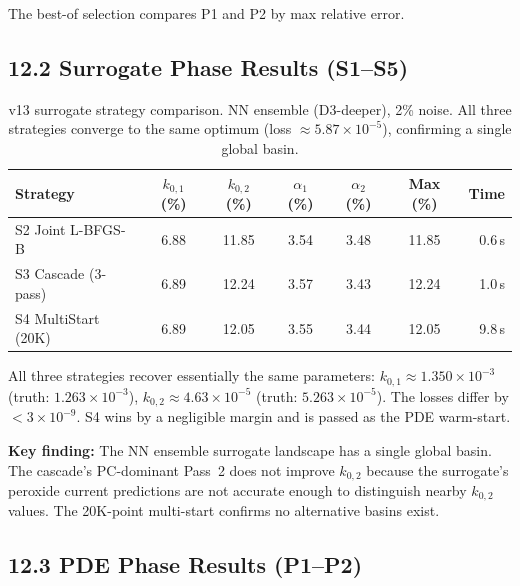 \documentclass[11pt]{article}
\begin{document}
The best-of selection compares P1 and P2 by max relative error.

\subsection*{12.2 Surrogate Phase Results (S1--S5)}

\begin{table}[H]
  \centering
  \caption{v13 surrogate strategy comparison.  NN ensemble (D3-deeper), 2\%
           noise.  All three strategies converge to the same optimum (loss
           $\approx 5.87 \times 10^{-5}$), confirming a single global basin.}
  \label{tab:v13_surr}
  \begin{tabular}{l S[round-precision=2] S[round-precision=2]
                    S[round-precision=2] S[round-precision=2]
                    S[round-precision=2] r}
    \toprule
    Strategy & {$k_{0,1}$ (\%)} & {$k_{0,2}$ (\%)}
             & {$\alpha_1$ (\%)} & {$\alpha_2$ (\%)}
             & {Max (\%)} & {Time} \\
    \midrule
    S2 Joint L-BFGS-B    & 6.88 & 11.85 & 3.54 & 3.48 & 11.85 & 0.6\,s  \\
    S3 Cascade (3-pass)  & 6.89 & 12.24 & 3.57 & 3.43 & 12.24 & 1.0\,s  \\
    S4 MultiStart (20K)  & 6.89 & 12.05 & 3.55 & 3.44 & 12.05 & 9.8\,s  \\
    \bottomrule
  \end{tabular}
\end{table}

All three strategies recover essentially the same parameters:
$k_{0,1} \approx 1.350 \times 10^{-3}$ (truth: $1.263 \times 10^{-3}$),
$k_{0,2} \approx 4.63 \times 10^{-5}$ (truth: $5.263 \times 10^{-5}$).
The losses differ by $< 3 \times 10^{-9}$.  S4 wins by a negligible margin
and is passed as the PDE warm-start.

\textbf{Key finding:} The NN ensemble surrogate landscape has a single global
basin.  The cascade's PC-dominant Pass~2 does not improve $k_{0,2}$ because
the surrogate's peroxide current predictions are not accurate enough to
distinguish nearby $k_{0,2}$ values.  The 20K-point multi-start confirms
no alternative basins exist.

\subsection*{12.3 PDE Phase Results (P1--P2)}
\end{document}
